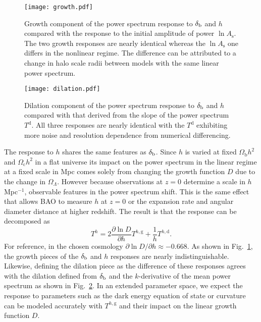\documentclass[prd,twocolumn,amsmath,amssymb,floatfix,superscriptaddress]{revtex4-1}
\newcommand{\Omegab}{{\Omega_\textrm{b}}}
\newcommand{\Omegac}{{\Omega_\textrm{c}}}
\newcommand{\lnAs}{{\ln\!A_\textrm{s}}}
\newcommand{\br}{{\rm b}}
\newcommand{\hMpci}{$h\,$Mpc$^{-1}$}
\begin{document}
{{\begin{figure}[tb]
    \centering
    \texttt{[image: growth.pdf]}
    \caption{
        \footnotesize Growth component of the power spectrum response to $\delta_\br$ and
        $h$ compared with the response to the initial amplitude of power $\lnAs$.
        The two growth responses are nearly identical  whereas the $\lnAs$ one differs in the
        nonlinear regime.  
       The difference can be attributed to a change in halo scale radii between models
       with the same linear power spectrum. 
    }
    \label{fig:growth}
\end{figure}





\begin{figure}[tb]
    \centering
    \texttt{[image: dilation.pdf]}
    \caption{
        \footnotesize Dilation component of the power spectrum response to $\delta_\br$ and
        $h$ compared with that derived from the slope of the power spectrum $T^\textrm{d}$.   All three responses are nearly identical with the $T^\textrm{d}$ exhibiting more noise and resolution
        dependence from numerical differencing. 
    }
    \label{fig:dilation}
\end{figure}





The response to $h$ shares the same features as $\delta_\br$.   
Since $h$ is varied at fixed $\Omegab h^2$ and $\Omegac h^2$ in a flat universe
its impact on
the power spectrum in the linear regime
 at a fixed scale in Mpc comes solely from changing the growth function $D$ due to the change in 
 $\Omega_\Lambda$.   However because
 observations at $z=0$ determine a scale in \hMpci, observable features in the power spectrum shift.  This is the same effect that allows BAO to measure $h$ at $z=0$ or
 the expansion rate and angular diameter distance at higher redshift.
 The result is that the response can be decomposed as 
 \begin{equation}
    T^h = 2\frac{\partial\ln D}{\partial h}T^{h,\textrm{g}}  + \frac{1}{h}T^{h,\textrm{d}}.
    \label{eq:Th}
\end{equation}
For reference, in the chosen cosmology $\partial \ln D/\partial h \approx -0.668$.
As shown in  Fig.~\ref{fig:growth}, the growth pieces of the $\delta_\br$ and $h$ responses
are nearly indistinguishable.   Likewise, defining the dilation piece as the difference
of these responses agrees with the dilation defined from $\delta_\br$
and 
the $k$-derivative
of the mean power spectrum
as shown in Fig.~\ref{fig:dilation}.
In an extended parameter space, 
 we expect the response to parameters 
 such as
the dark energy equation of state or curvature can be modeled accurately with
$T^{h,\textrm{g}}$ and their impact on the linear growth function $D$.



}}
\end{document}
